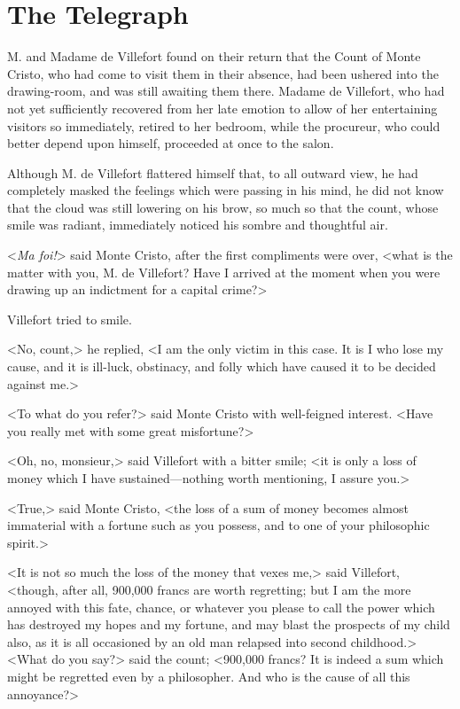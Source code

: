 \chapter{The Telegraph} 
	
\lettrine{M}{.} and Madame de Villefort found on their return that the Count of Monte Cristo, who had come to visit them in their absence, had been ushered into the drawing-room, and was still awaiting them there. Madame de Villefort, who had not yet sufficiently recovered from her late emotion to allow of her entertaining visitors so immediately, retired to her bedroom, while the procureur, who could better depend upon himself, proceeded at once to the salon. 

 Although M. de Villefort flattered himself that, to all outward view, he had completely masked the feelings which were passing in his mind, he did not know that the cloud was still lowering on his brow, so much so that the count, whose smile was radiant, immediately noticed his sombre and thoughtful air. 

 <\textit{Ma foi!}> said Monte Cristo, after the first compliments were over, <what is the matter with you, M. de Villefort? Have I arrived at the moment when you were drawing up an indictment for a capital crime?> 

 Villefort tried to smile. 

 <No, count,> he replied, <I am the only victim in this case. It is I who lose my cause, and it is ill-luck, obstinacy, and folly which have caused it to be decided against me.> 

 <To what do you refer?> said Monte Cristo with well-feigned interest. <Have you really met with some great misfortune?> 

 <Oh, no, monsieur,> said Villefort with a bitter smile; <it is only a loss of money which I have sustained—nothing worth mentioning, I assure you.> 

 <True,> said Monte Cristo, <the loss of a sum of money becomes almost immaterial with a fortune such as you possess, and to one of your philosophic spirit.> 

 <It is not so much the loss of the money that vexes me,> said Villefort, <though, after all, 900,000 francs are worth regretting; but I am the more annoyed with this fate, chance, or whatever you please to call the power which has destroyed my hopes and my fortune, and may blast the prospects of my child also, as it is all occasioned by an old man relapsed into second childhood.>  <What do you say?> said the count; <900,000 francs? It is indeed a sum which might be regretted even by a philosopher. And who is the cause of all this annoyance?> 

